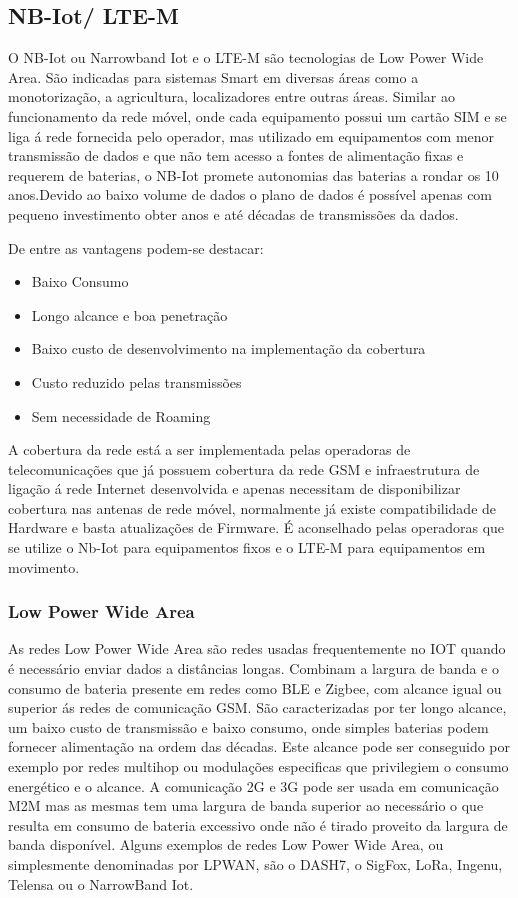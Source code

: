 \subsection {NB-Iot/ LTE-M}
O NB-Iot ou Narrowband Iot  e o LTE-M são tecnologias de Low Power Wide Area. São indicadas para sistemas Smart em diversas áreas como a monotorização, a agricultura, localizadores entre outras áreas. Similar ao funcionamento da rede móvel, onde cada equipamento possui um cartão SIM e se liga á rede fornecida pelo operador, mas utilizado em equipamentos com menor transmissão de dados e que não tem acesso a fontes de alimentação fixas e requerem de baterias, o NB-Iot promete autonomias das baterias a rondar os 10 anos\cite{u_2017}.Devido ao baixo volume de dados o plano de dados é possível apenas com pequeno investimento obter anos e até décadas de transmissões da dados.
\par De entre as vantagens podem-se destacar:
\begin{itemize}
\item Baixo Consumo
\item Longo alcance e boa penetração
\item Baixo custo de desenvolvimento na implementação da cobertura
\item Custo reduzido pelas transmissões
\item Sem necessidade de Roaming
\end{itemize}
\par
A cobertura da rede está a ser implementada pelas operadoras de telecomunicações que já possuem cobertura da rede GSM e infraestrutura de ligação á rede Internet desenvolvida e apenas necessitam de 
disponibilizar cobertura nas antenas de rede móvel, normalmente já existe compatibilidade de Hardware e basta atualizações de Firmware. É aconselhado pelas operadoras que se utilize o Nb-Iot para equipamentos fixos e o LTE-M para equipamentos em movimento.

\subsubsection { Low Power Wide Area}
As redes Low Power Wide Area são redes usadas frequentemente no IOT quando é necessário enviar dados a distâncias longas. Combinam a largura de banda e o consumo de bateria presente em redes como BLE e Zigbee, com alcance igual ou superior ás redes de comunicação GSM. São caracterizadas por ter longo alcance, um baixo custo de transmissão e baixo consumo, onde simples baterias podem fornecer alimentação na ordem das décadas. Este alcance pode ser conseguido por exemplo por redes multihop ou modulações especificas que privilegiem o consumo energético e o alcance. A comunicação 2G e 3G pode ser usada em comunicação M2M mas as mesmas tem uma largura de banda superior ao necessário o que resulta em consumo de bateria excessivo onde não é tirado proveito da largura de banda disponível. Alguns exemplos de redes Low Power Wide Area, ou simplesmente denominadas por LPWAN, são o DASH7, o SigFox, LoRa, Ingenu, Telensa ou o NarrowBand Iot.\cite{lpwanoverview}

